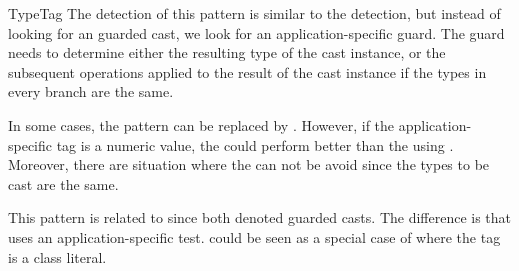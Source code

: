 \begin{pattern}{TypeTag}
\detection{}
The detection of this pattern is similar to the  detection, but instead of looking for an  guarded cast, we look for an application-specific guard.
The guard needs to determine either the resulting type of the cast instance, or
the subsequent operations applied to the result of the cast instance if the types in every branch are the same.

\discussion{}
In some cases, the \thisp{} pattern can be replaced by .
However, if the application-specific tag is a numeric value,
the \thisp{} could perform better than the  using .
Moreover, there are situation where the \thisp{} can not be avoid since the types to be cast are the same.

\related{}
%
This pattern is related to  since both denoted guarded casts.
The difference is that \thisp{} uses an application-specific test.
 could be seen as a special case of \thisp{} where the tag is a class literal.

\end{pattern}
